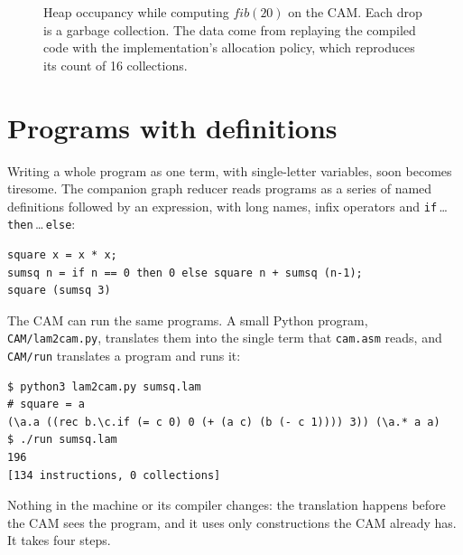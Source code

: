 \documentclass[11pt,a4paper]{article}
\theoremstyle{definition}
\theoremstyle{plain}
\begin{document}
\begin{figure}[t]
\caption{Heap occupancy while computing $\mathit{fib}(20)$ on the CAM. Each
drop is a garbage collection. The data come from replaying the compiled code
with the implementation's allocation policy, which reproduces its count of 16
collections.}
\label{fig:heap}
\end{figure}

\section{Programs with definitions}\label{sec:lam2cam}

Writing a whole program as one term, with single-letter variables, soon
becomes tiresome. The companion graph reducer reads programs as a series of
named definitions followed by an expression, with long names, infix
operators and \texttt{if}\,\ldots\,\texttt{then}\,\ldots\,\texttt{else}:
\begin{lstlisting}[style=cam]
square x = x * x;
sumsq n = if n == 0 then 0 else square n + sumsq (n-1);
square (sumsq 3)
\end{lstlisting}
The CAM can run the same programs. A small Python program,
\texttt{CAM/lam2cam.py}, translates them into the single term that
\texttt{cam.asm} reads, and \texttt{CAM/run} translates a program and runs
it:
\begin{lstlisting}[style=cam]
$ python3 lam2cam.py sumsq.lam
# square = a
(\a.a ((rec b.\c.if (= c 0) 0 (+ (a c) (b (- c 1)))) 3)) (\a.* a a)
$ ./run sumsq.lam
196
[134 instructions, 0 collections]
\end{lstlisting}
Nothing in the machine or its compiler changes: the translation happens
before the CAM sees the program, and it uses only constructions the CAM
already has. It takes four steps.
\end{document}
